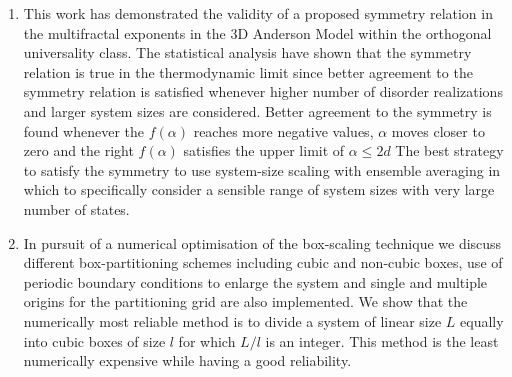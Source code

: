 \begin{enumerate}
\item
This work has demonstrated the validity of a proposed symmetry relation in the multifractal exponents in the 3D Anderson Model within the orthogonal universality class.  The statistical analysis have shown that the symmetry relation is true in the thermodynamic limit since better agreement to the symmetry relation is satisfied whenever higher number of disorder realizations and larger system sizes are considered.  
Better agreement to the symmetry is found whenever the $f(\alpha)$ reaches more negative values, $\alpha$ moves closer to zero and the right $f(\alpha)$ satisfies the upper limit of $\alpha\leq 2d$
The best strategy to satisfy the symmetry to use system-size scaling with ensemble averaging in which to specifically consider a sensible range of system sizes with very large number of states.

\item
In pursuit of a numerical optimisation of the box-scaling technique we discuss  different box-partitioning schemes including cubic and non-cubic boxes, use of periodic boundary conditions to enlarge the system and single and multiple origins  for the partitioning grid are also implemented.  We show that the numerically most reliable method is to divide a system of linear size $L$ equally into cubic boxes of size $l$ for which $L/l$ is an integer. This method is the least numerically expensive while having a good reliability.



\end{enumerate}

















